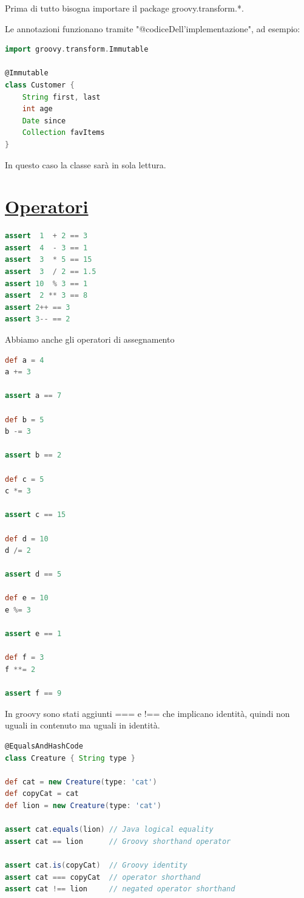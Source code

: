 \documentclass[11pt,a4paper]{book}
\begin{document}
Prima di tutto bisogna importare il package groovy.transform.*.

Le annotazioni funzionano tramite "@codiceDell'implementazione", ad esempio:
\begin{lstlisting}[language = groovy]
import groovy.transform.Immutable

@Immutable
class Customer {
	String first, last
	int age
	Date since
	Collection favItems
}
\end{lstlisting}

In questo caso la classe sarà in sola lettura.

\section{\href{https://groovy-lang.org/operators.html}{Operatori}}
\begin{lstlisting}[language = groovy]
assert  1  + 2 == 3
assert  4  - 3 == 1
assert  3  * 5 == 15
assert  3  / 2 == 1.5
assert 10  % 3 == 1
assert  2 ** 3 == 8
assert 2++ == 3
assert 3-- == 2
\end{lstlisting}

Abbiamo anche gli operatori di assegnamento
\begin{lstlisting}[language = groovy]
def a = 4
a += 3

assert a == 7

def b = 5
b -= 3

assert b == 2

def c = 5
c *= 3

assert c == 15

def d = 10
d /= 2

assert d == 5

def e = 10
e %= 3

assert e == 1

def f = 3
f **= 2

assert f == 9
\end{lstlisting}

In groovy sono stati aggiunti === e !== che implicano identità, quindi non uguali in contenuto ma uguali in identità.
\begin{lstlisting}[language = groovy]
@EqualsAndHashCode
class Creature { String type }

def cat = new Creature(type: 'cat')
def copyCat = cat
def lion = new Creature(type: 'cat')

assert cat.equals(lion) // Java logical equality
assert cat == lion      // Groovy shorthand operator

assert cat.is(copyCat)  // Groovy identity
assert cat === copyCat  // operator shorthand
assert cat !== lion     // negated operator shorthand
\end{lstlisting}
\end{document}
